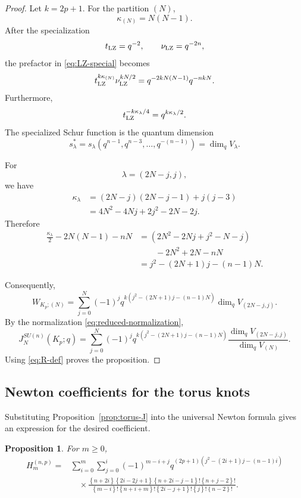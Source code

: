 \documentclass[11pt]{amsart}
\newtheorem{proposition}[theorem]{Proposition}
\newcommand{\curly}[1]{\left\{#1\right\}}
\begin{document}
\begin{proof}
Let \(k=2p+1\).
For the partition \((N)\),
\[
\kappa_{(N)}
=
N(N-1).
\]
After the specialization
\[
t_{\rm LZ}=q^{-2},
\qquad
\nu_{\rm LZ}=q^{-2n},
\]
the prefactor in \eqref{eq:LZ-special} becomes
\[
t_{\rm LZ}^{k\kappa_{(N)}}
\nu_{\rm LZ}^{kN/2}
=
q^{-2kN(N-1)}
q^{-nkN}.
\]
Furthermore,
\[
t_{\rm LZ}^{-k\kappa_\lambda/4}
=
q^{k\kappa_\lambda/2}.
\]
The specialized Schur function is the quantum dimension
\[
s_\lambda^*
=
s_\lambda(q^{n-1},q^{n-3},\ldots,q^{-(n-1)})
=
\dim_qV_\lambda.
\]

For
\[
\lambda=(2N-j,j),
\]
we have
\begin{align*}
\kappa_\lambda
&=
(2N-j)(2N-j-1)+j(j-3)
\\
&=
4N^2-4Nj+2j^2-2N-2j.
\end{align*}
Therefore
\begin{align*}
\frac{\kappa_\lambda}{2}
-2N(N-1)-nN
&=
\left(
2N^2-2Nj+j^2-N-j
\right)
\\
&\qquad
-2N^2+2N-nN
\\
&=
j^2-(2N+1)j-(n-1)N.
\end{align*}

Consequently,
\[
W_{K_p;(N)}
=
\sum_{j=0}^{N}
(-1)^j
q^{k(j^2-(2N+1)j-(n-1)N)}
\dim_qV_{(2N-j,j)}.
\]
By the normalization \eqref{eq:reduced-normalization},
\[
J_N^{SU(n)}(K_p;q)
=
\sum_{j=0}^{N}
(-1)^j
q^{k(j^2-(2N+1)j-(n-1)N)}
\frac{\dim_qV_{(2N-j,j)}}{\dim_qV_{(N)}}.
\]
Using \eqref{eq:R-def} proves the proposition.
\end{proof}



\subsection{Newton coefficients for the torus knots}
\label{sec:explicit-H}


Substituting Proposition~\ref{prop:torus-J} into the universal
Newton formula gives an expression for the desired coefficient.

\begin{proposition}\label{prop:H-double-sum}
For \(m\geq0\),
\begin{align}
H_m^{(n,p)}
={}&
\sum_{i=0}^{m}\sum_{j=0}^{i}
(-1)^{m-i+j}
q^{(2p+1)
\left(
j^2-(2i+1)j-(n-1)i
\right)}
\nonumber\\
&\quad\times
\frac{
\curly{n+2i}
\curly{2i-2j+1}
\curly{n+2i-j-1}!
\curly{n+j-2}!
}{
\curly{m-i}!
\curly{n+i+m}!
\curly{2i-j+1}!
\curly{j}!
\curly{n-2}!
}.
\label{eq:H-double-sum}
\end{align}
\end{proposition}
\end{document}
